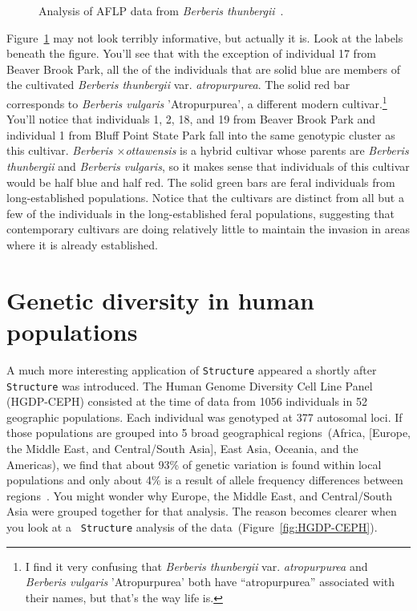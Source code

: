 \documentclass[12pt]{article}
\begin{document}
\begin{figure}
\caption{Analysis of AFLP data from {\it Berberis
    thunbergii}~\cite{Lubell-etal-2008}.}\label{fig:lubell-structure} 
\end{figure}

Figure~\ref{fig:lubell-structure} may not look terribly informative,
but actually it is. Look at the labels beneath the figure. You'll see
that with the exception of individual 17 from Beaver Brook Park, all
the of the individuals that are solid blue are members of the
cultivated {\it Berberis thunbergii\/} var. {\it atropurpurea}. The
solid red bar corresponds to {\it Berberis vulgaris\/} 'Atropurpurea',
a different modern cultivar.\footnote{I find it very confusing that
  {\it Berberis thunbergii\/} var. {\it atropurpurea\/} and {\it
    Berberis vulgaris\/} 'Atropurpurea' both have ``atropurpurea''
  associated with their names, but that's the way life is.} You'll
notice that individuals 1, 2, 18, and 19 from Beaver Brook Park and
individual 1 from Bluff Point State Park fall into the same genotypic
cluster as this cultivar. {\it Berberis $\times$ottawensis} is a
hybrid cultivar whose parents are {\it Berberis thunbergii\/} and {\it
  Berberis vulgaris\/}, so it makes sense that individuals of this
cultivar would be half blue and half red. The solid green bars are
feral individuals from long-established populations. Notice that the
cultivars are distinct from all but a few of the individuals in the
long-established feral populations, suggesting that contemporary
cultivars are doing relatively little to maintain the invasion in
areas where it is already established.

\section*{Genetic diversity in human populations}

A much more interesting application of {\tt Structure} appeared a
shortly after {\tt Structure} was introduced. The Human Genome
Diversity Cell Line Panel (HGDP-CEPH) consisted at
the time of data from 1056 individuals in 52 geographic
populations. Each individual was genotyped at 377 autosomal loci. If
those populations are grouped into 5 broad geographical
regions~(Africa, [Europe, the Middle East, and Central/South Asia],
East Asia, Oceania, and the Americas), we find that about 93\% of
genetic variation is found within local populations and only about 4\%
is a result of allele frequency differences between
regions~\cite{Rosenberg-etal-2002}. You might wonder why Europe, the
Middle East, and Central/South Asia were grouped together for that
analysis. The reason becomes clearer when you look at a {\tt
  Structure} analysis of the data~(Figure~\ref{fig:HGDP-CEPH}).
\end{document}
